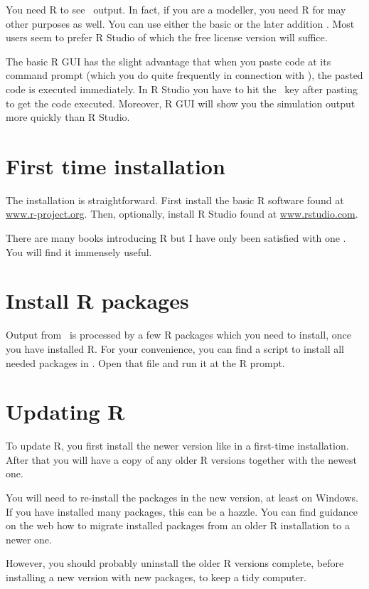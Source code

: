 You need R to see \US\ output. In fact, if you are a modeller, you need R for may other purposes as well. You can use either the basic  or the later addition . Most users seem to prefer R Studio of which the free license version will suffice.

The basic R GUI has the slight advantage that when you paste code at its command prompt (which you do quite frequently in connection with \US), the pasted code is executed immediately. In R Studio you have to hit the \returnkey\ key after pasting to get the code executed. Moreover, R GUI will show you the simulation output more quickly than R Studio.

\section{First time installation}
The installation is straightforward. First install the basic R software found at \url{www.r-project.org}. Then, optionally, install R Studio found at \url{www.rstudio.com}.

There are many books introducing R but I have only been satisfied with one \citep{Landers17}. You will find it immensely useful. 

\section{Install R packages}
Output from \US\ is processed by a few  R packages which you need to install, once you have installed R. For your convenience, you can find a script to install all needed packages in  . Open that file and run it at the R prompt.

\section{Updating R}
To update R, you first install the newer version like in a first-time installation. After that you will have a copy of any older R versions together with the newest one. 

You will need to re-install the packages in the new version, at least on Windows. If you have installed many packages, this can be a hazzle. You can find guidance on the web how to migrate installed packages from an older R installation to a newer one.

However, you should probably uninstall the older R versions complete, before installing a new version with new packages, to keep a tidy computer.

